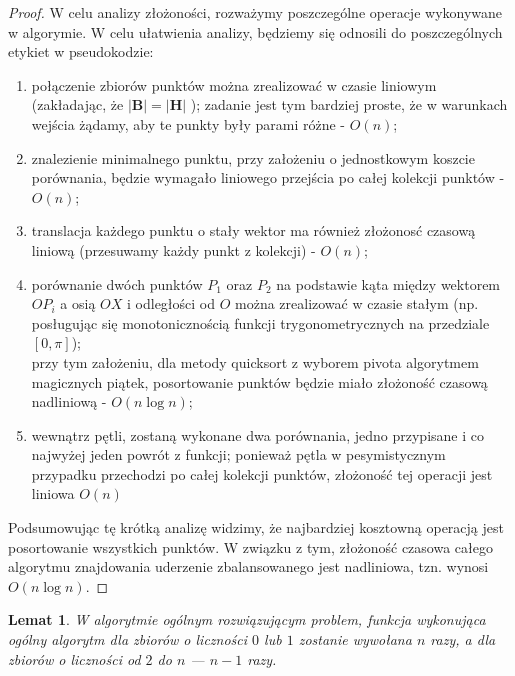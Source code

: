 \documentclass[10pt,a4paper]{article}
\newtheorem{lemma}{Lemat}
\begin{document}
	\begin{proof}
		W celu analizy złożoności, rozważymy poszczególne operacje wykonywane w algorymie. W celu ułatwienia analizy, będziemy się odnosili do poszczególnych etykiet w pseudokodzie:
		\begin{enumerate}
			\item połączenie zbiorów punktów można zrealizować w czasie liniowym (zakładając, że $|\mathbf{B}| = |\mathbf{H}|$ ); zadanie jest tym bardziej proste, że w warunkach wejścia żądamy, aby te punkty były parami różne - $O(n)$;
			\item znalezienie minimalnego punktu, przy założeniu o jednostkowym koszcie porównania, będzie wymagało liniowego przejścia po całej kolekcji punktów - $O(n)$;
			\item translacja każdego punktu o stały wektor ma również złożonosć czasową liniową (przesuwamy każdy punkt z kolekcji) - $O(n)$;
			\item porównanie dwóch punktów $P_{1}$ oraz $P_{2}$ na podstawie kąta między wektorem $OP_{i}$ a osią $OX$ i odległości od $O$ można zrealizować w czasie stałym (np. posługując się monotonicznością funkcji trygonometrycznych na przedziale $\left[0, \pi\right]$); \\ przy tym założeniu, dla metody quicksort z wyborem pivota algorytmem magicznych piątek, posortowanie punktów będzie miało złożoność czasową nadliniową - $O(n \log n)$;
			\item wewnątrz pętli, zostaną wykonane dwa porównania, jedno przypisane i co najwyżej jeden powrót z funkcji; ponieważ pętla w pesymistycznym przypadku przechodzi po całej kolekcji punktów, złożoność tej operacji jest liniowa $O(n)$
		\end{enumerate}
		
		Podsumowując tę krótką analizę widzimy, że najbardziej kosztowną operacją jest posortowanie wszystkich punktów. W związku z tym, złożoność czasowa całego algorytmu znajdowania uderzenie zbalansowanego jest nadliniowa, tzn. wynosi $O(n \log n)$.
	\end{proof}
	
	\vspace{1em}
	
	\begin{lemma} \label{lemma:3}
		W algorytmie ogólnym rozwiązującym problem, funkcja wykonująca ogólny algorytm dla zbiorów o liczności $0$ lub $1$ zostanie wywołana $n$ razy, a dla zbiorów o liczności od $2$ do $n$ — $n - 1$ razy.
	\end{lemma}
	
\end{document}

